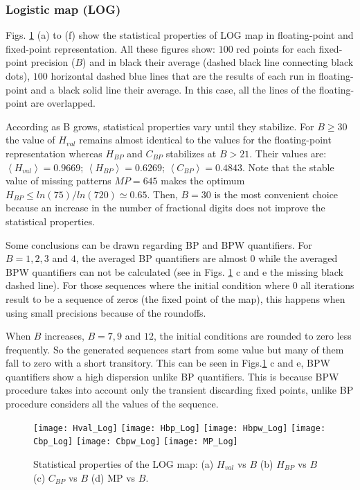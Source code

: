 \subsubsection{Logistic map (LOG)} \label{subsubsec:log}

Figs. \ref{fig:LOG_QuantiB} (a) to (f) show the statistical properties of LOG map in floating-point and fixed-point representation.
All these figures show: $100$ red points for each fixed-point precision ($B$) and in black their average (dashed black line connecting black dots), $100$ horizontal dashed blue lines that are the results of each run in floating-point and a black solid line their average.
In this case, all the lines of the floating-point are overlapped.

According as B grows, statistical properties vary until they stabilize.
For $B\geq 30$ the value of $H_{val}$ remains almost identical to the values for the floating-point representation whereas $H_{BP}$ and $C_{BP}$ stabilizes at $B>21$.
Their values are: $\left\langle H_{val}\right\rangle =0.9669$; $\left\langle H_{BP}\right\rangle =0.6269$; $\left\langle C_{BP}\right\rangle=0.4843$.
Note that the stable value of missing patterns $MP=645$ makes the optimum $H_{BP} \leq ln(75)/ln(720) \simeq 0.65$.
Then, $B=30$ is the most convenient choice because an increase in the number of fractional digits does not improve the statistical properties.

Some conclusions can be drawn regarding BP and BPW quantifiers.
For $B=1, 2, 3$ and $4$, the averaged BP quantifiers are almost $0$ while the averaged BPW quantifiers can not be calculated (see in Figs. \ref{fig:LOG_QuantiB} c and e the missing black dashed line).
For those sequences where the initial condition where $0$ all iterations result to be a sequence of zeros (the fixed point of the map), this happens when using small precisions because of the roundoffs.

When $B$ increases, $B=7, 9$ and $12$, the initial conditions are rounded to zero less frequently.
So the generated sequences start from some value but many of them fall to zero with a short transitory.
This can be seen in Figs.\ref{fig:LOG_QuantiB} c and e, BPW quantifiers show a high dispersion unlike BP quantifiers.
This is because BPW procedure takes into account only the transient discarding fixed points, unlike BP procedure considers all the values of the sequence. 

\begin{figure}
	\texttt{[image: Hval\_Log]}
	\texttt{[image: Hbp\_Log]}
	\texttt{[image: Hbpw\_Log]}
	\texttt{[image: Cbp\_Log]}
	\texttt{[image: Cbpw\_Log]}
	\texttt{[image: MP\_Log]}
	\caption{Statistical properties of the LOG map: (a) $H_{val}$ vs $B$ (b) $H_{BP}$ vs $B$ (c) $C_{BP}$ vs $B$ (d) MP vs $B$.}
	\label{fig:LOG_QuantiB}
\end{figure}


